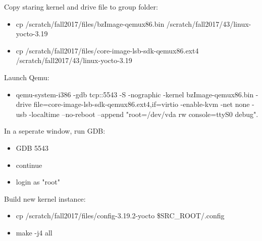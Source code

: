 \documentclass[letterpaper,onecolumn,10pt,titlepage]{IEEEtran}
\begin{document}
\par
Copy staring kernel and drive file to group folder:\\
\begin{itemize}
    \item cp /scratch/fall2017/files/bzImage-qemux86.bin /scratch/fall2017/43/linux-yocto-3.19\\
    \item cp /scratch/fall2017/files/core-image-lsb-sdk-qemux86.ext4 /scratch/fall2017/43/linux-yocto-3.19\\
\end{itemize}
\par
Launch Qemu:\\
\begin{itemize}
    \item qemu-system-i386 -gdb tcp::5543 -S -nographic -kernel bzImage-qemux86.bin -drive file=core-image-lsb-sdk-qemux86.ext4,if=virtio -enable-kvm -net none -usb -localtime --no-reboot --append "root=/dev/vda rw console=ttyS0 debug".\\
\end{itemize}
\par
In a seperate window, run GDB:\\
\begin{itemize}
\item GDB 5543\\
\item continue\\
\item login as "root"\\
\end{itemize}
\par
Build new kernel instance:\\
\begin{itemize}
    \item cp /scratch/fall2017/files/config-3.19.2-yocto \$SRC\_ROOT/.config\\
    \item make -j4 all\\
\end{itemize}    
\par



\end{document}
